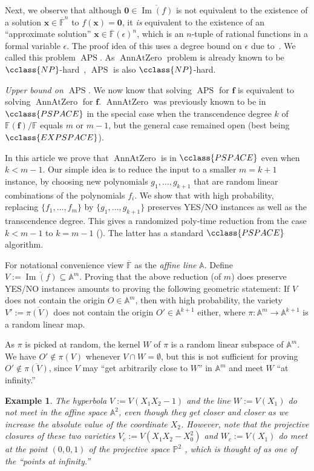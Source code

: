\documentclass{toc}
\newtheorem{exmp}{Example}
\newcommand{\F}{\mathbb{F}}
\newcommand{\aff}{\mathbb{A}}
\newcommand{\proj}{\mathbb{P}}
\DeclareMathOperator{\im}{\mathrm{Im}}
\newcommand{\ol}[1]{\overline{#1}}
\newcommand{\NP}{\cclass{NP}\xspace}  %
\newcommand{\PSPACE}{\cclass{PSPACE}\xspace}  %
\newcommand{\EXPSPACE}{\cclass{EXPSPACE}\xspace} %
\DeclareMathOperator{\APS}{\mathrm{APS}\xspace} %
\DeclareMathOperator{\AnnAtZero}{\mathrm{AnnAtZero}\xspace} %
\begin{document}
Next, we observe that although $\mathbf{0}\in \overline{\im(f)}$ is not equivalent to the existence of a solution $\mathbf x\in \ol{\F}^n$ to $f(\mathbf x)= \mathbf 0$, it \emph{is} equivalent to the existence of an  ``approximate solution'' $\mathbf x\in \ol{\F}(\epsilon)^n$, which is an $n$-tuple of rational functions in a formal variable $\epsilon$. The proof idea of this uses a degree bound on $\epsilon$ due to~\cite{LL89}. We called this problem $\APS$. As $\AnnAtZero$ problem is already known to be $\NP$-hard~\cite{Kay09}, $\APS$ is also $\NP$-hard. 

%
\emph{Upper bound on $\APS$.}   %
We now know 
%
that solving %
 $\APS$ for $\mathbf f$ is equivalent to solving $\AnnAtZero$ for $\mathbf f$. $\AnnAtZero$ was previously known to be in $\PSPACE$ in the special case when the transcendence degree $k$ of $\F(\mathbf f)/\F$ equals $m$ or $m-1$, but the general case remained open (best being
%
$\EXPSPACE$).   %

In this
%
article  %
we prove that $\AnnAtZero$ is in $\PSPACE$ even when $k<m-1$. Our simple idea is to reduce the input to a smaller $m=k+1$ instance, by choosing new polynomials $g_1,\dots,g_{k+1}$ that are random linear combinations of 
%
the polynomials $f_i$. %
We show that with high probability, replacing $\{f_1,\dots,f_m\}$ by $\{g_1,\dots,g_{k+1}\}$ preserves YES/NO instances as well as the transcendence degree. This gives a randomized poly-time reduction from the case $k<m-1$ to $k=m-1$ (). The latter has a standard $\PSPACE$ algorithm.

For notational convenience view $\ol{\F}$ as the \emph{affine line} $\aff$.
Define $V:=\overline{\im(f)}\subseteq \aff^m$. Proving that the above reduction (of $m$) does preserve YES/NO instances amounts to proving the following geometric statement: If $V$ does not contain the origin $O\in\aff^m$, then with high probability, the variety $V':=\overline{\pi(V)}$ does not contain the origin $O'\in\aff^{k+1}$ either, where $\pi:\aff^m\to \aff^{k+1}$ is a random linear map. 

As $\pi$ is picked at random, the kernel $W$ of $\pi$ is a random linear subspace of $\aff^m$.
We have $O'\not\in \pi(V)$ whenever $V\cap  W=\emptyset$, but this is not sufficient for proving $O'\not\in \overline{\pi(V)}$, since $V$ may ``get arbitrarily close to $W$'' in $\aff^m$ and meet $W$ ``at infinity.'' 

\begin{exmp}
The hyperbola $V:=V(X_1 X_2-1)$ and the line $W:=V(X_1)$ do not meet in the affine space $\aff^2$, even though they get closer and closer as we increase the absolute value of the coordinate $X_2$.
However, note that the  projective closures of these two varieties $V_c:=V(X_1X_2-X_0^2)$ and $W_c:=V(X_1)$ do meet at the point $(0,0,1)$ of  the projective space $\proj^2$ , which is thought of as one of the ``points at infinity.'' %
\end{exmp}
\end{document}
